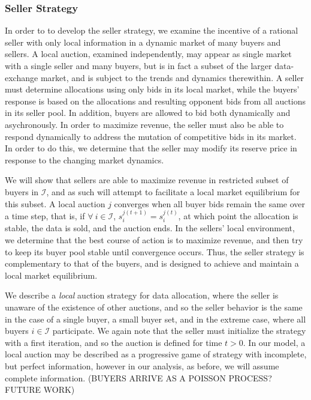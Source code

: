 \documentclass[sigconf, anonymous]{acmart}
\newcommand{\mcI}{\mathcal{I}}
\theoremstyle{definition}
\begin{document}
\subsubsection{Seller Strategy}
In order to to develop the seller strategy, we examine the incentive of a
rational seller with only local information in a dynamic market of many
buyers and sellers. A local auction, examined independently, may appear as
single market with a single seller and many buyers, but is in fact a subset of the
larger data-exchange market, and is subject to the trends and dynamics
therewithin. A seller must determine allocations using only bids in its local market, while the buyers' response is based on the
allocations and resulting opponent bids from all auctions in its seller pool.
In addition, buyers are allowed to bid both dynamically and asychronously. 
In order to
maximize revenue, the seller must also be able to respond dynamically to
address the mutation of competitive bids in its market. In order to do this, we
determine that the seller may modify its reserve price in response to the
changing market dynamics.

We will show that sellers are able to maximize revenue in restricted subset of
buyers in $\mcI$, and as such will attempt to facilitate a local market
equilibrium for this subset. A local auction $j$ converges when all buyer bids
remain the same over a time step, that is, if $\forall \ i \in\mcI$,
$s_i^{j(t+1)} = s_i^{j(t)}$, at which point the allocation is stable, the data
is sold, and the auction ends. In the sellers' local environment, we determine
that the best course of action is to maximize revenue, and then try to keep its
buyer pool stable until convergence occurs. Thus, the seller strategy is
complementary to that of the buyers, and is designed to achieve and maintain a
local market equilibrium. 

We describe a \emph{local} auction strategy for data allocation, where the seller is unaware of the existence of other auctions, and so
the seller behavior is the same in the case of a single buyer, a small buyer set, and in the
extreme case, where all buyers $i\in\mcI$ participate. We again note that the
seller must initialize the strategy with a first iteration, and so the auction
is defined for time $t>0$.
In our model, a local auction may be described as a progressive game of strategy with
incomplete, but perfect information, however in our analysis, as before, we will assume
complete information. 
(BUYERS ARRIVE AS A POISSON PROCESS? FUTURE WORK)
\end{document}

